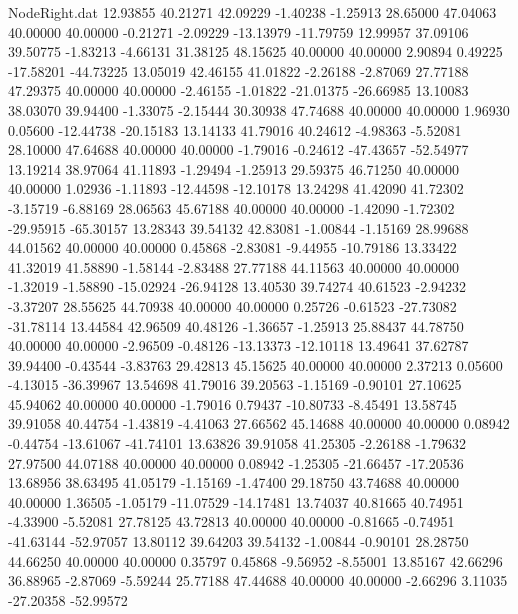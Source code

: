 \begin{filecontents}{NodeRight.dat}
  12.93855   40.21271   42.09229    -1.40238   -1.25913   28.65000   47.04063   40.00000   40.00000   -0.21271   -2.09229  -13.13979  -11.79759
  12.99957   37.09106   39.50775    -1.83213   -4.66131   31.38125   48.15625   40.00000   40.00000    2.90894    0.49225  -17.58201  -44.73225
  13.05019   42.46155   41.01822    -2.26188   -2.87069   27.77188   47.29375   40.00000   40.00000   -2.46155   -1.01822  -21.01375  -26.66985
  13.10083   38.03070   39.94400    -1.33075   -2.15444   30.30938   47.74688   40.00000   40.00000    1.96930    0.05600  -12.44738  -20.15183
  13.14133   41.79016   40.24612    -4.98363   -5.52081   28.10000   47.64688   40.00000   40.00000   -1.79016   -0.24612  -47.43657  -52.54977
  13.19214   38.97064   41.11893    -1.29494   -1.25913   29.59375   46.71250   40.00000   40.00000    1.02936   -1.11893  -12.44598  -12.10178
  13.24298   41.42090   41.72302    -3.15719   -6.88169   28.06563   45.67188   40.00000   40.00000   -1.42090   -1.72302  -29.95915  -65.30157
  13.28343   39.54132   42.83081    -1.00844   -1.15169   28.99688   44.01562   40.00000   40.00000    0.45868   -2.83081   -9.44955  -10.79186
  13.33422   41.32019   41.58890    -1.58144   -2.83488   27.77188   44.11563   40.00000   40.00000   -1.32019   -1.58890  -15.02924  -26.94128
  13.40530   39.74274   40.61523    -2.94232   -3.37207   28.55625   44.70938   40.00000   40.00000    0.25726   -0.61523  -27.73082  -31.78114
  13.44584   42.96509   40.48126    -1.36657   -1.25913   25.88437   44.78750   40.00000   40.00000   -2.96509   -0.48126  -13.13373  -12.10118
  13.49641   37.62787   39.94400    -0.43544   -3.83763   29.42813   45.15625   40.00000   40.00000    2.37213    0.05600   -4.13015  -36.39967
  13.54698   41.79016   39.20563    -1.15169   -0.90101   27.10625   45.94062   40.00000   40.00000   -1.79016    0.79437  -10.80733   -8.45491
  13.58745   39.91058   40.44754    -1.43819   -4.41063   27.66562   45.14688   40.00000   40.00000    0.08942   -0.44754  -13.61067  -41.74101
  13.63826   39.91058   41.25305    -2.26188   -1.79632   27.97500   44.07188   40.00000   40.00000    0.08942   -1.25305  -21.66457  -17.20536
  13.68956   38.63495   41.05179    -1.15169   -1.47400   29.18750   43.74688   40.00000   40.00000    1.36505   -1.05179  -11.07529  -14.17481
  13.74037   40.81665   40.74951    -4.33900   -5.52081   27.78125   43.72813   40.00000   40.00000   -0.81665   -0.74951  -41.63144  -52.97057
  13.80112   39.64203   39.54132    -1.00844   -0.90101   28.28750   44.66250   40.00000   40.00000    0.35797    0.45868   -9.56952   -8.55001
  13.85167   42.66296   36.88965    -2.87069   -5.59244   25.77188   47.44688   40.00000   40.00000   -2.66296    3.11035  -27.20358  -52.99572

\end{filecontents}
